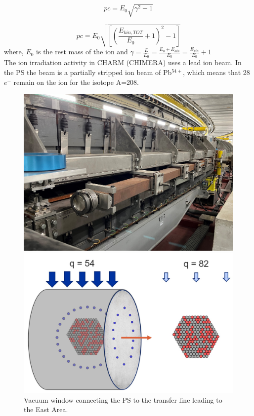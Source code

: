\documentclass{cernatsnote}
\begin{document}
$$pc={E_{0}\sqrt{\gamma^{2}-1}}$$

$$pc = E_{0}\sqrt{\left [ \left( \frac{E_{kin, TOT}}{E_{0}}+1\right )^{2}-1\right ]}$$
where, $E_{0}$ is the rest mass of the ion and $\gamma=\frac{E}{E_{0}}=\frac{E_{0}+E_{kin}}{E_{0}} = \frac{E_{kin}}{E_{0}}+1$
\\

The ion irradiation activity in CHARM (CHIMERA) uses a lead ion beam. In the PS the beam is a partially stripped ion beam of Pb$^{54+}$, which means that 28 $e^{-}$ remain on the ion for the isotope A=208.
\\

\begin{figure}
    \centering
    \begin{minipage}{0.45\textwidth}
        \centering
        \includegraphics[width=1.0\textwidth]{images/PS_BEAM_ENERGY/vaccum_window.jpg}
        \caption{Vacuum window connecting the PS to the transfer line leading to the East Area.}
        \label{fig:vaccum window}
    \end{minipage}\hfill
    \begin{minipage}{0.45\textwidth}
        \centering
        \includegraphics[width=1.0\textwidth]{images/PS_BEAM_ENERGY/stripping.jpg} 

\end{minipage}
\end{figure}
\end{document}
